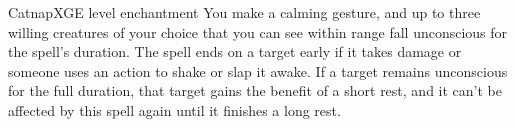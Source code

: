 \begin{spell}{Catnap}{XGE}{ level enchantment}
{
}
You make a calming gesture, and up to three willing creatures of your choice
that you can see within range fall unconscious for the spell’s duration. The
spell ends on a target early if it takes damage or someone uses an action to
shake or slap it awake. If a target remains unconscious for the full duration,
that target gains the benefit of a short rest, and it can’t be affected by this
spell again until it finishes a long rest.
\end{spell}
